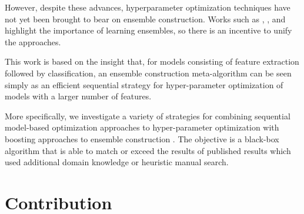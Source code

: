 \documentclass[11pt,twocolumn]{article}
\begin{document}
\vspace{11pt}
However, despite these advances, hyperparameter optimization techniques have not
yet been brought to bear on ensemble construction.  Works such as
\cite{gehler+nowozin:2009}, \cite{coates+lee+ng:2011},
and \cite{pinto+cox:2011} highlight the importance of learning ensembles, so there is an incentive
to unify the approaches.

\vspace{11pt}
This work is based on the insight that, for models consisting of feature extraction followed by classification,
an ensemble construction meta-algorithm can be seen simply as an
efficient sequential strategy for hyper-parameter optimization of
models with a larger number of features.

\vspace{11pt}
More specifically, we investigate a variety of strategies for combining sequential model-based
optimization approaches to hyper-parameter optimization with boosting
approaches to ensemble construction \cite{mason+baxter+bartlett+fraen:1999,
friedman:1999}.
The objective is a black-box algorithm that is able to match or exceed the
results of published results which used additional domain knowledge or
heuristic manual search.

\section{Contribution}

\iffalse
\begin{figure}
    \texttt{[image: convergence\_100\_10.pdf]}

    \texttt{[image: figures/dbn\_efficiency/dbn\_efficiency\_mnist\_basic]}
    \caption{

    }
\end{figure}
\fi
\end{document}
